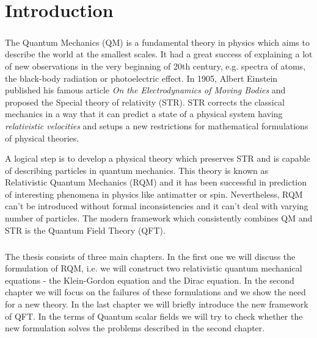\chapter*{Introduction}

\paragraph{} The Quantum Mechanics (QM) is a fundamental theory in physics which aims to describe
the world at the smallest scales. It had a great success of explaining
a lot of new observations in the very beginning of 20th century, e.g. spectra of atoms,
the black-body radiation or photoelectric effect. In 1905, Albert Einstein published his
famous article \textit{On the Electrodynamics of Moving Bodies} and proposed the Special 
theory of relativity (STR). STR corrects the classical mechanics in a way that it can predict
a state of a physical system having \textit{relativistic velocities} and setups a 
new restrictions for mathematical formulations of physical theories.

A logical step is to develop a physical theory which preserves STR and is capable of 
describing particles in quantum mechanics. This theory is known as Relativistic Quantum 
Mechanics (RQM) and it has been successful in prediction of interesting phenomena in physics
like antimatter or spin. Nevertheless, RQM can't be introduced without formal inconsistencies
and it can't deal with varying number of particles. The modern framework which consistently 
combines QM and STR is the Quantum Field Theory (QFT).

\paragraph{} The thesis consists of three main chapters. In the first one we will discuss the formulation
of RQM, i.e. we will construct two relativistic quantum mechanical equations - the Klein-Gordon 
equation and the Dirac equation. In the second chapter we will focus on the failures of these 
formulations and we show the need for a new theory. In the last chapter we will briefly introduce
the new framework of QFT. In the terms of Quantum scalar fields we will try to check whether
the new formulation solves the problems described in the second chapter.
